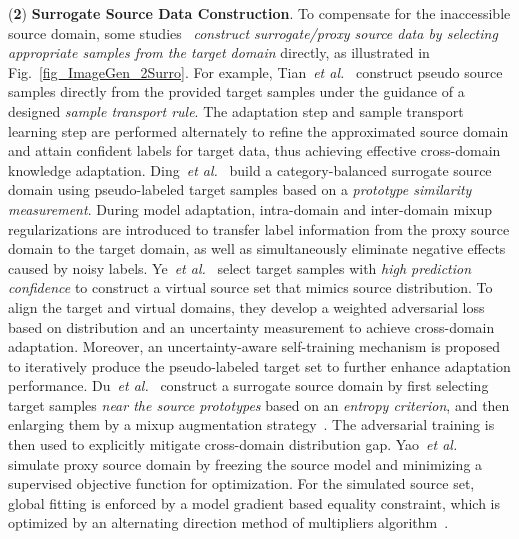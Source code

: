 \documentclass[10pt,journal,compsoc]{IEEEtran}
\def\etal{{\em et al.}}
\def\ie{{\em i.e.}}
\begin{document}
(\textbf{2}) \textbf{Surrogate Source Data Construction}. 
To compensate for the inaccessible source domain, some studies~\cite{tian2021source, ding2022proxymix, ye2021source, du2021generation, yao2021sourcesurro} \emph{construct surrogate/proxy source data by selecting appropriate samples from the target domain} directly, as illustrated in Fig.~\ref{fig_ImageGen_2Surro}. 
For example, Tian~\etal~\cite{tian2021source} construct pseudo source samples directly from the provided target samples under the guidance of a designed \emph{sample transport rule}.
The adaptation step and sample transport learning step are performed alternately to refine the approximated source domain and attain confident labels for target data, thus achieving effective cross-domain knowledge adaptation.
Ding~\etal~\cite{ding2022proxymix} build a category-balanced surrogate source domain using pseudo-labeled target samples based on a \emph{prototype similarity measurement}.
During model adaptation, intra-domain and inter-domain mixup regularizations are introduced to transfer label information from the proxy source domain to the target domain, as well as simultaneously eliminate negative effects caused by noisy labels.
Ye~\etal~\cite{ye2021source} select target samples with \emph{high prediction confidence} to construct a virtual source set that mimics source distribution.
To align the target and virtual domains, they develop a weighted adversarial loss based on distribution and an uncertainty measurement to achieve cross-domain adaptation.
Moreover, an uncertainty-aware self-training mechanism is proposed to iteratively produce the pseudo-labeled target set to further enhance adaptation performance.
Du~\etal~\cite{du2021generation} construct a surrogate source domain by first selecting target samples \emph{near the source prototypes} based on an \emph{entropy criterion}, and then enlarging them by a mixup augmentation strategy~\cite{zhang2017mixup}.
The adversarial training is then used to explicitly mitigate cross-domain distribution gap.
Yao~\etal~\cite{yao2021sourcesurro} simulate proxy source domain by freezing the source model and minimizing a supervised objective function for optimization.
For the simulated source set, global fitting is enforced by a model gradient based equality constraint, which is optimized by an alternating direction method of multipliers algorithm~\cite{boyd2011distributed}.
\end{document}
